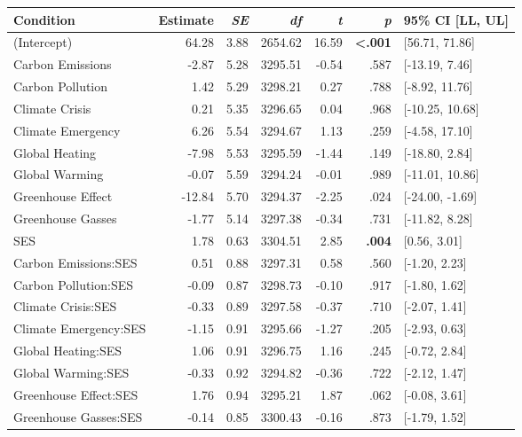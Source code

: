 \begin{table}[ht]
\centering
\begin{tabular}{lrrrrrl}
  \hline
Condition & Estimate & \textit{SE} & \textit{df} & \textit{t} & \textit{p} & 95\% CI [LL, UL] \\ 
  \hline
(Intercept) & 64.28 & 3.88 & 2654.62 & 16.59 & \textbf{\textless  .001} & [56.71, 71.86] \\ 
  Carbon Emissions & -2.87 & 5.28 & 3295.51 & -0.54 & .587 & [-13.19, 7.46] \\ 
  Carbon Pollution & 1.42 & 5.29 & 3298.21 & 0.27 & .788 & [-8.92, 11.76] \\ 
  Climate Crisis & 0.21 & 5.35 & 3296.65 & 0.04 & .968 & [-10.25, 10.68] \\ 
  Climate Emergency & 6.26 & 5.54 & 3294.67 & 1.13 & .259 & [-4.58, 17.10] \\ 
  Global Heating & -7.98 & 5.53 & 3295.59 & -1.44 & .149 & [-18.80, 2.84] \\ 
  Global Warming & -0.07 & 5.59 & 3294.24 & -0.01 & .989 & [-11.01, 10.86] \\ 
  Greenhouse Effect & -12.84 & 5.70 & 3294.37 & -2.25 & .024 & [-24.00, -1.69] \\ 
  Greenhouse Gasses & -1.77 & 5.14 & 3297.38 & -0.34 & .731 & [-11.82, 8.28] \\ 
  SES & 1.78 & 0.63 & 3304.51 & 2.85 & \textbf{.004} & [0.56, 3.01] \\ 
  Carbon Emissions:SES & 0.51 & 0.88 & 3297.31 & 0.58 & .560 & [-1.20, 2.23] \\ 
  Carbon Pollution:SES & -0.09 & 0.87 & 3298.73 & -0.10 & .917 & [-1.80, 1.62] \\ 
  Climate Crisis:SES & -0.33 & 0.89 & 3297.58 & -0.37 & .710 & [-2.07, 1.41] \\ 
  Climate Emergency:SES & -1.15 & 0.91 & 3295.66 & -1.27 & .205 & [-2.93, 0.63] \\ 
  Global Heating:SES & 1.06 & 0.91 & 3296.75 & 1.16 & .245 & [-0.72, 2.84] \\ 
  Global Warming:SES & -0.33 & 0.92 & 3294.82 & -0.36 & .722 & [-2.12, 1.47] \\ 
  Greenhouse Effect:SES & 1.76 & 0.94 & 3295.21 & 1.87 & .062 & [-0.08, 3.61] \\ 
  Greenhouse Gasses:SES & -0.14 & 0.85 & 3300.43 & -0.16 & .873 & [-1.79, 1.52] \\ 
   \hline
\end{tabular}
\end{table}

